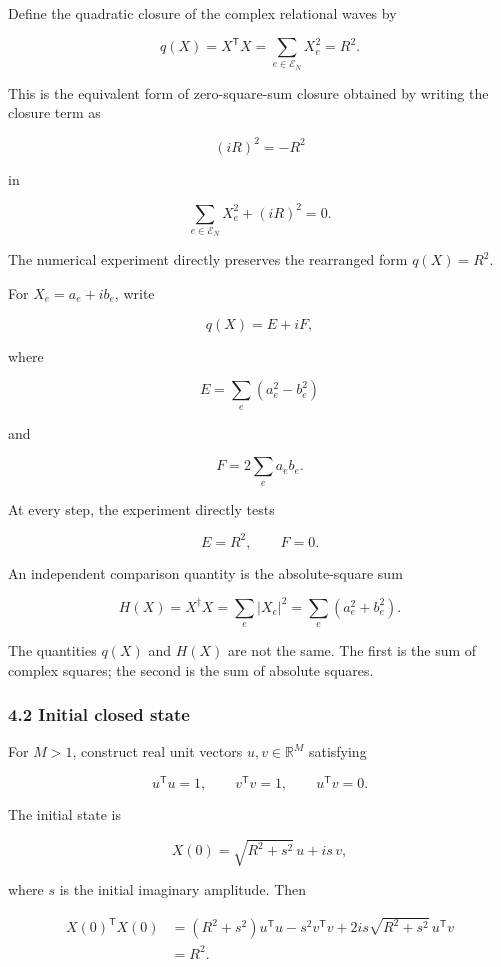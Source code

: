 \documentclass[
  10pt,
  a4paper,
]{article}
\begin{document}
Define the quadratic closure of the complex relational waves by

\[
q(X)
=
X^{\mathsf T}X
=
\sum_{e\in\mathcal E_N}X_e^2
=
R^2.
\]

This is the equivalent form of zero-square-sum closure obtained by
writing the closure term as

\[
(iR)^2=-R^2
\]

in

\[
\sum_{e\in\mathcal E_N}X_e^2+(iR)^2=0.
\]

The numerical experiment directly preserves the rearranged form
\(q(X)=R^2\).

For \(X_e=a_e+i b_e\), write

\[
q(X)=E+iF,
\]

where

\[
E
=
\sum_e\left(a_e^2-b_e^2\right)
\]

and

\[
F
=
2\sum_e a_e b_e.
\]

At every step, the experiment directly tests

\[
E=R^2,
\qquad
F=0.
\]

An independent comparison quantity is the absolute-square sum

\[
H(X)
=
X^\dagger X
=
\sum_e\lvert X_e\rvert^2
=
\sum_e\left(a_e^2+b_e^2\right).
\]

The quantities \(q(X)\) and \(H(X)\) are not the same. The first is the
sum of complex squares; the second is the sum of absolute squares.

\subsubsection{4.2 Initial closed state}\label{initial-closed-state}

For \(M>1\), construct real unit vectors \(u,v\in\mathbb R^M\)
satisfying

\[
u^{\mathsf T}u=1,
\qquad
v^{\mathsf T}v=1,
\qquad
u^{\mathsf T}v=0.
\]

The initial state is

\[
X(0)
=
\sqrt{R^2+s^2}\,u
+
i s\,v,
\]

where \(s\) is the initial imaginary amplitude. Then

\[
\begin{aligned}
X(0)^{\mathsf T}X(0)
&=
(R^2+s^2)u^{\mathsf T}u
-s^2v^{\mathsf T}v
+2is\sqrt{R^2+s^2}\,u^{\mathsf T}v\\
&=R^2.
\end{aligned}
\]
\end{document}
